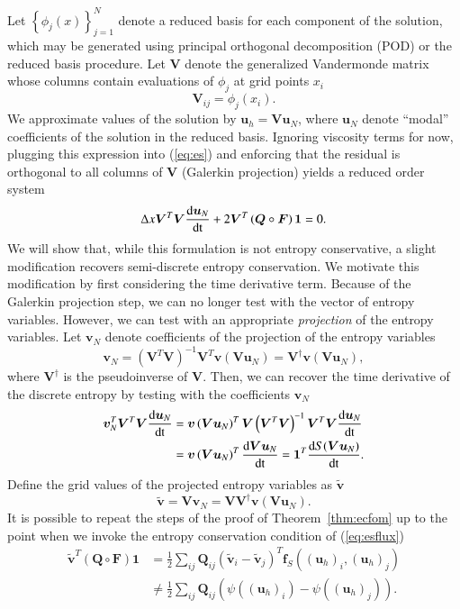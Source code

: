 \documentclass[preprint,10pt]{elsarticle}
\theoremstyle{definition}
\theoremstyle{lemma}
\theoremstyle{theorem}
\theoremstyle{assumption}
\renewcommand{\tilde}{\widetilde}
\newcommand{\td}[2]{\frac{{\rm d}#1}{{\rm d}{\rm #2}}}
\newcommand{\LRp}[1]{\left( #1 \right)}
\newcommand{\LRc}[1]{\left\{ #1 \right\}}
\begin{document}
Let $\LRc{{\phi}_j(x)}_{j=1}^{N}$ denote a reduced basis for each component of the solution, which may be generated using principal orthogonal decomposition (POD) or the reduced basis procedure.  Let $\bm{V}$ denote the generalized Vandermonde matrix whose columns contain evaluations of $\phi_j$ at grid points $x_i$
\[
\bm{V}_{ij} = {\phi}_j(x_i).
\]
We approximate values of the solution by $\bm{u}_h = \bm{V}\bm{u}_N$, where $\bm{u}_N$ denote ``modal'' coefficients  of the solution in the reduced basis.  Ignoring viscosity terms for now, plugging this expression into (\ref{eq:es}) and enforcing that the residual is orthogonal to all columns of $\bm{V}$ (Galerkin projection) yields a reduced order system
\begin{align*}
\Delta x\bm{V}^T\bm{V}\td{\bm{u}_N}{t} + 2\bm{V}^T\LRp{\bm{Q}\circ \bm{F}}\bm{1} = 0.
\end{align*}
We will show that, while this formulation is not entropy conservative, a slight modification recovers semi-discrete entropy conservation.  We motivate this modification by first considering the time derivative term.  Because of the Galerkin projection step, we can no longer test with the vector of entropy variables.  However, we can test with an appropriate \textit{projection} of the entropy variables.  Let $\bm{v}_N$ denote coefficients of the projection of the entropy variables
\[
\bm{v}_N = \LRp{\bm{V}^T\bm{V}}^{-1}\bm{V}^T \bm{v}\LRp{\bm{V}\bm{u}_N} = \bm{V}^{\dagger} \bm{v}\LRp{\bm{V}\bm{u}_N},
\]
where $\bm{V}^{\dagger}$ is the pseudoinverse of $\bm{V}$.  Then, we can recover the time derivative of the discrete entropy by testing with the coefficients $\bm{v}_N$
\begin{align}
\bm{v}_N^T\bm{V}^T\bm{V}\td{\bm{u}_N}{t} &= \bm{v}\LRp{\bm{V}\bm{u}_N}^T \bm{V}\LRp{\bm{V}^T\bm{V}}^{-1}\bm{V}^T\bm{V} \td{\bm{u}_N}{t} \label{eq:esromtime}\\
&= 
 \bm{v}\LRp{\bm{V}\bm{u}_N}^T \td{\bm{V}\bm{u}_N}{t} = \bm{1}^T\td{S(\bm{V}\bm{u}_N)}{t}.\nonumber
\end{align}
Define the grid values of the projected entropy variables as $\tilde{\bm{v}}$ 
\[
\tilde{\bm{v}} = \bm{V}\bm{v}_N = \bm{V}\bm{V}^{\dagger} \bm{v}\LRp{\bm{V}\bm{u}_N}.
\]
It is possible to repeat the steps of the proof of Theorem~\ref{thm:ecfom} up to the point when we invoke the entropy conservation condition of (\ref{eq:esflux})
\begin{align*}
\tilde{\bm{v}}^T\LRp{{\bm{Q}}\circ \bm{F}}\bm{1} &= \frac{1}{2}\sum_{ij} \bm{Q}_{ij} \LRp{\tilde{\bm{v}}_i-\tilde{\bm{v}}_j}^T \bm{f}_{S}\LRp{\LRp{\bm{u}_h}_i, \LRp{\bm{u}_h}_j}\\
&\neq \frac{1}{2}\sum_{ij} \bm{Q}_{ij} \LRp{ \psi((\bm{u}_h)_i)- \psi((\bm{u}_h)_j)}.
\end{align*}
\end{document}
